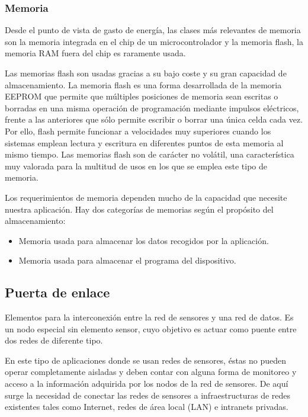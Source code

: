 \subsubsection{Memoria}
Desde el punto de vista de gasto de energ\'ia, las clases m\'as relevantes de memoria son la memoria integrada en el chip de
un microcontrolador y la memoria flash, la memoria RAM fuera del chip es raramente usada.

Las memorias flash son usadas gracias a su bajo coste y su gran capacidad de almacenamiento. La memoria flash es una
forma desarrollada de la memoria EEPROM que permite que m\'ultiples posiciones de memoria sean escritas o borradas en una
misma operaci\'on de programaci\'on mediante impulsos el\'ectricos, frente a las anteriores que s\'olo permite escribir o
borrar una \'unica celda cada vez. Por ello, flash permite funcionar a velocidades muy superiores cuando los sistemas
emplean lectura y escritura en diferentes puntos de esta memoria al mismo tiempo. Las memorias flash son de car\'acter no
vol\'atil, una caracter\'istica muy valorada para la multitud de usos en los que se emplea este tipo de memoria. 

Los requerimientos de memoria dependen mucho de la capacidad que necesite nuestra aplicaci\'on. Hay dos categor\'ias de
memorias seg\'un el prop\'osito del almacenamiento: 

\begin{itemize}
\item Memoria usada para almacenar los datos recogidos por la aplicaci\'on. 
\item Memoria usada para almacenar el programa del dispositivo.
\end{itemize}


\subsection{Puerta de enlace}
Elementos para la interconexi\'on entre la red de sensores y una red de datos. Es un nodo especial sin elemento sensor,
cuyo objetivo es actuar como puente entre dos redes de diferente tipo. 

En este tipo de aplicaciones donde se usan redes de sensores, \'estas no pueden operar completamente aisladas y deben
contar con alguna forma de monitoreo y acceso a la informaci\'on adquirida por los nodos de la red de sensores. De aqu\'i
surge la necesidad de conectar las redes de sensores a infraestructuras de redes existentes tales como Internet, redes
de \'area local (LAN) e intranets privadas. 

